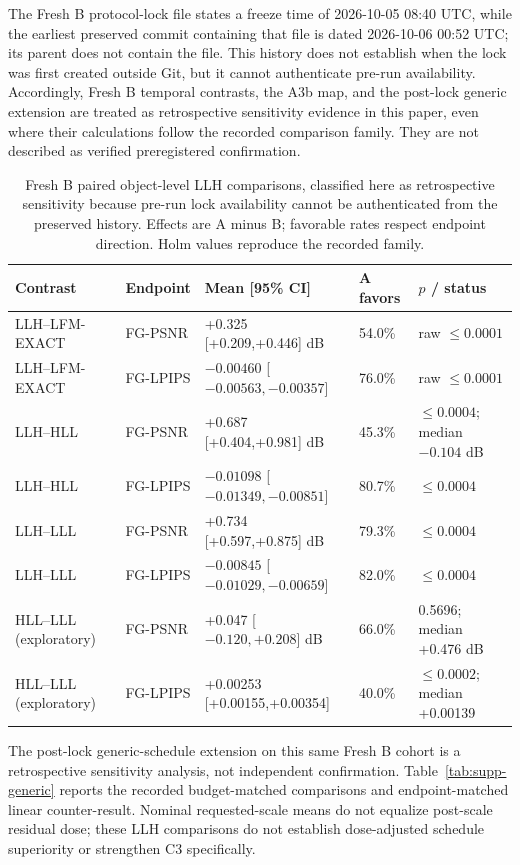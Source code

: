 \documentclass[11pt]{article}
\begin{document}
The Fresh B protocol-lock file states a freeze time of 2026-10-05 08:40 UTC, while the earliest preserved commit containing that file is dated 2026-10-06 00:52 UTC; its parent does not contain the file. This history does not establish when the lock was first created outside Git, but it cannot authenticate pre-run availability. Accordingly, Fresh B temporal contrasts, the A3b map, and the post-lock generic extension are treated as retrospective sensitivity evidence in this paper, even where their calculations follow the recorded comparison family. They are not described as verified preregistered confirmation.

\begin{table}[ht]
\centering\small
\caption{Fresh B paired object-level LLH comparisons, classified here as retrospective sensitivity because pre-run lock availability cannot be authenticated from the preserved history. Effects are A minus B; favorable rates respect endpoint direction. Holm values reproduce the recorded family.}\label{tab:supp-freshb}
\begin{tabular}{p{3.7cm}p{1.7cm}p{5.7cm}p{1.4cm}p{2.2cm}}\toprule Contrast & Endpoint & Mean [95\% CI] & A favors & $p$ / status \\\midrule
LLH--LFM-EXACT & FG-PSNR & +0.325 [+0.209,+0.446] dB & 54.0\% & raw $\leq0.0001$ \\
LLH--LFM-EXACT & FG-LPIPS & $-0.00460$ [$-0.00563,-0.00357$] & 76.0\% & raw $\leq0.0001$ \\
LLH--HLL & FG-PSNR & +0.687 [+0.404,+0.981] dB & 45.3\% & $\leq0.0004$; median $-0.104$ dB \\
LLH--HLL & FG-LPIPS & $-0.01098$ [$-0.01349,-0.00851$] & 80.7\% & $\leq0.0004$ \\
LLH--LLL & FG-PSNR & +0.734 [+0.597,+0.875] dB & 79.3\% & $\leq0.0004$ \\
LLH--LLL & FG-LPIPS & $-0.00845$ [$-0.01029,-0.00659$] & 82.0\% & $\leq0.0004$ \\
HLL--LLL (exploratory) & FG-PSNR & +0.047 [$-0.120,+0.208$] dB & 66.0\% & 0.5696; median +0.476 dB \\
HLL--LLL (exploratory) & FG-LPIPS & +0.00253 [+0.00155,+0.00354] & 40.0\% & $\leq0.0002$; median +0.00139 \\
\bottomrule\end{tabular}
\end{table}

The post-lock generic-schedule extension on this same Fresh B cohort is a retrospective sensitivity analysis, not independent confirmation. Table~\ref{tab:supp-generic} reports the recorded budget-matched comparisons and endpoint-matched linear counter-result. Nominal requested-scale means do not equalize post-scale residual dose; these LLH comparisons do not establish dose-adjusted schedule superiority or strengthen C3 specifically.
\end{document}

